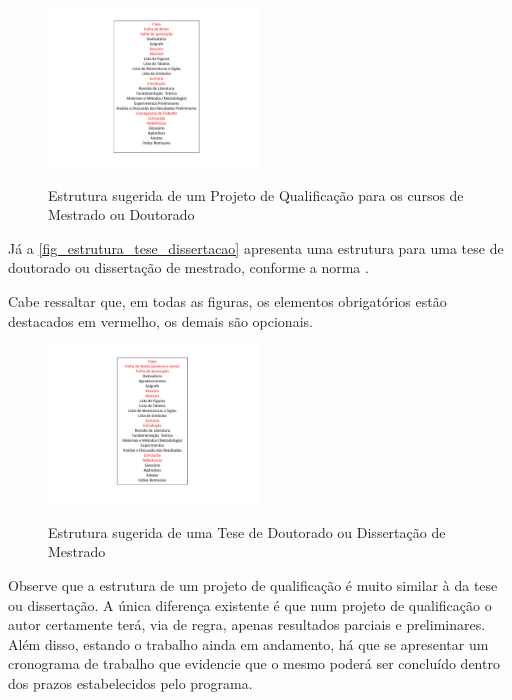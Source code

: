 \begin{apendicesenv}
    \begin{figure}[!htb]
        \centering
        \caption{Estrutura sugerida de um Projeto de Qualificação para os cursos de Mestrado ou Doutorado}
        \includegraphics[width=0.5\textwidth]{./figuras/estrutura-projeto-qualificacao}
        \label{fig_estrutura_projeto_qualificacao}
    \end{figure}

    Já a \autoref{fig_estrutura_tese_dissertacao} apresenta uma estrutura para uma tese de doutorado ou dissertação de mestrado, conforme a norma .

    Cabe ressaltar que, em todas as figuras, os elementos obrigatórios estão destacados em vermelho, os demais são opcionais.

    \begin{figure}[!htb]
        \centering
        \caption{Estrutura sugerida de uma Tese de Doutorado ou Dissertação de Mestrado}
        \includegraphics[width=0.5\textwidth]{./figuras/estrutura-tese-dissertacao}
        \label{fig_estrutura_tese_dissertacao}
    \end{figure}

    \newpage

    Observe que a estrutura de um projeto de qualificação é muito similar à da tese ou dissertação.
    A única diferença existente é que num projeto de qualificação o autor certamente terá, via de regra, apenas resultados parciais e preliminares.
    Além disso, estando o trabalho ainda em andamento, há que se apresentar um cronograma de trabalho que evidencie que o mesmo poderá ser concluído dentro dos prazos estabelecidos pelo programa.


\end{apendicesenv}
